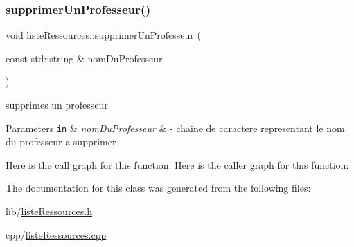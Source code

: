 \subsubsection{\texorpdfstring{supprimer\+Un\+Professeur()}{supprimerUnProfesseur()}}
{\footnotesize\ttfamily void liste\+Ressources\+::supprimer\+Un\+Professeur (\begin{DoxyParamCaption}\item[{const std\+::string \&}]{nom\+Du\+Professeur }\end{DoxyParamCaption})}



supprimes un professeur 


\begin{DoxyParams}[1]{Parameters}
\mbox{\tt in}  & {\em nom\+Du\+Professeur} & -\/ chaine de caractere representant le nom du professeur a supprimer \\
\hline
\end{DoxyParams}
Here is the call graph for this function\+:
Here is the caller graph for this function\+:


The documentation for this class was generated from the following files\+:\begin{DoxyCompactItemize}
\item 
lib/\hyperlink{liste_ressources_8h}{liste\+Ressources.\+h}\item 
cpp/\hyperlink{liste_ressources_8cpp}{liste\+Ressources.\+cpp}\end{DoxyCompactItemize}
